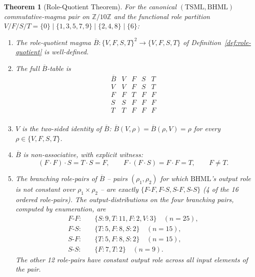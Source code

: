 \documentclass[11pt,reqno]{amsart}
\theoremstyle{plain}
\newtheorem{theorem}{Theorem}[section]
\theoremstyle{definition}
\theoremstyle{remark}
\newcommand{\Z}{\mathbb{Z}}
\newcommand{\TS}{\mathrm{TSML}}
\newcommand{\BH}{\mathrm{BHML}}
\newcommand{\Bbar}{\overline{B}}
\begin{document}
\begin{theorem}[Role-Quotient Theorem] \label{thm:role-quotient}
For the canonical $(\TS, \BH)$ commutative-magma pair on $\Z/10\Z$
and the functional role partition
$V/F/S/T = \{0\} \mid \{1, 3, 5, 7, 9\} \mid \{2, 4, 8\} \mid \{6\}$:

\begin{enumerate}[label=(\roman*)]
\item The role-quotient magma $\Bbar : \{V, F, S, T\}^2 \to \{V, F, S, T\}$
of Definition~\ref{def:role-quotient} is well-defined.

\item The full $\Bbar$-table is
\[
\begin{array}{c|cccc}
\Bbar & V & F & S & T \\
\hline
V & V & F & S & T \\
F & F & T & F & F \\
S & S & F & F & F \\
T & T & F & F & F \\
\end{array}
\]

\item $V$ is the two-sided identity of $\Bbar$:
$\Bbar(V, \rho) = \Bbar(\rho, V) = \rho$ for every
$\rho \in \{V, F, S, T\}$.

\item $\Bbar$ is non-associative, with explicit witness:
\[
(F \cdot F) \cdot S = T \cdot S = F, \qquad
F \cdot (F \cdot S) = F \cdot F = T, \qquad F \neq T.
\]

\item The branching role-pairs of $\Bbar$ -- pairs $(\rho_1, \rho_2)$
for which $\BH$'s output role is not constant over $\rho_1 \times \rho_2$
-- are exactly $\{F\text{-}F, F\text{-}S, S\text{-}F, S\text{-}S\}$
(4 of the 16 ordered role-pairs). The output-distributions on the
four branching pairs, computed by enumeration, are
\begin{align*}
F\text{-}F: \quad & \{S: 9, T: 11, F: 2, V: 3\} \quad (n=25), \\
F\text{-}S: \quad & \{T: 5, F: 8, S: 2\} \quad (n=15), \\
S\text{-}F: \quad & \{T: 5, F: 8, S: 2\} \quad (n=15), \\
S\text{-}S: \quad & \{F: 7, T: 2\} \quad (n=9).
\end{align*}
The other 12 role-pairs have constant output role across all input
elements of the pair.
\end{enumerate}
\end{theorem}
\end{document}
